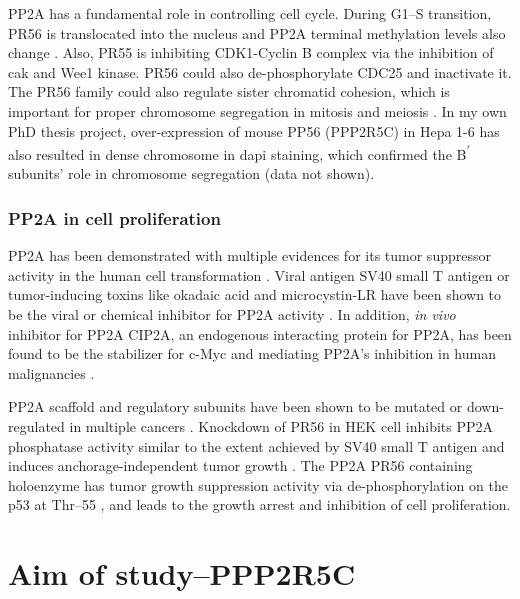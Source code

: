PP2A has a fundamental role in controlling cell cycle. During G1--S transition, PR56\textgamma{} is translocated into the nucleus and PP2A terminal methylation levels also change \cite{eichhorn_protein_2009}. Also, PR55\textalpha{} is inhibiting CDK1-Cyclin B complex via the inhibition of \gls{cak} and Wee1 kinase. PR56\textdelta{} could also de-phosphorylate CDC25 and inactivate it. The PR56 family could also regulate sister chromatid cohesion, which is important for proper chromosome segregation in mitosis and meiosis \cite{hu_scaffold_2014,kitajima_shugoshin_2006}. In my own PhD thesis project, over-expression of mouse PP56\textgamma{} (PPP2R5C) in Hepa 1-6 has also resulted in dense chromosome in \gls{dapi} staining, which confirmed the B\textsuperscript{$\prime$} subunits' role in chromosome segregation (data not shown). 


\subsubsection{PP2A in cell proliferation}

PP2A has been demonstrated with multiple evidences for its tumor suppressor activity in the human cell transformation \cite{janssens_pp2a:_2005,mumby_pp2a:_2007}. Viral antigen SV40 small T antigen or tumor-inducing toxins like okadaic acid and microcystin-LR have been shown to be the viral or chemical inhibitor for PP2A activity \cite{campbell_identification_1995,nagao_protein_1995}. In addition, \textit{in vivo} inhibitor for PP2A CIP2A, an endogenous interacting protein for PP2A, has been found to be the stabilizer for c-Myc and mediating PP2A's inhibition in human malignancies \cite{khanna_cancerous_2013,junttila_cip2a_2007}. 

PP2A scaffold and regulatory subunits have been shown to be mutated or down-regulated in multiple cancers \cite{seshacharyulu_phosphatase:_2013}. Knockdown of PR56\textgamma{} in HEK cell inhibits PP2A phosphatase activity similar to the extent achieved by SV40 small T antigen and induces anchorage-independent tumor growth \cite{chen_identification_2004}. The PP2A PR56\textgamma{} containing holoenzyme has tumor growth suppression activity via de-phosphorylation on the p53 at Thr--55 \cite{li_specific_2007,shouse_serine_2008}, and leads to the growth arrest and inhibition of cell proliferation.

\section{Aim of study--PPP2R5C}

